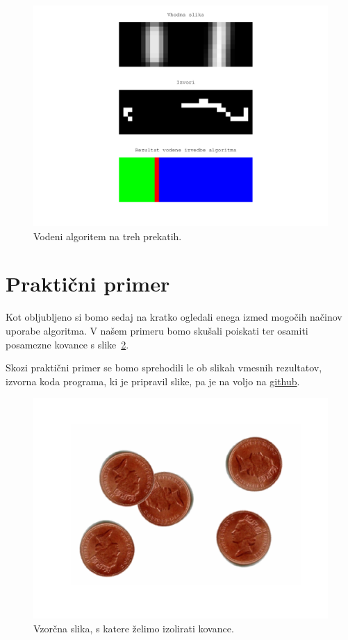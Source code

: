 \documentclass[a4paper, 11pt]{article}
\begin{document}
\begin{figure}
  \centering
  \includegraphics[width=.8\textwidth]{t4-seed-2-result}
  \caption{Vodeni algoritem na treh prekatih.}
  \label{img:t4-seed-2-result}
\end{figure}


\section{Praktični primer}

Kot obljubljeno si bomo sedaj na kratko ogledali enega izmed mogočih načinov uporabe algoritma. V našem primeru bomo skušali poiskati ter osamiti posamezne kovance s slike~\ref{img:coins-input}.

Skozi praktični primer se bomo sprehodili le ob slikah vmesnih rezultatov, izvorna koda programa, ki je pripravil slike, pa je na voljo na \url{github}.

\begin{figure}[htb]
  \centering
  \includegraphics[width=.6\textwidth]{coins-input}
  \caption{Vzorčna slika, s katere želimo izolirati kovance.}
  \label{img:coins-input}
\end{figure}
\end{document}
